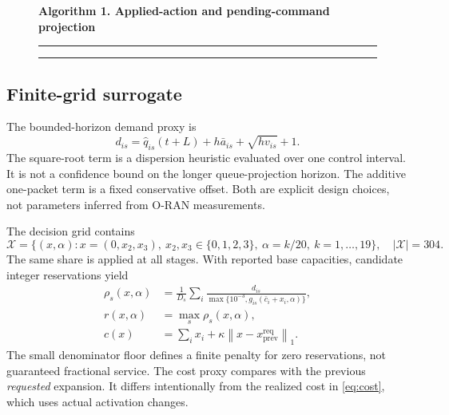\documentclass[10pt,a4paper]{article}
\newcommand{\norm}[1]{\left\lVert#1\right\rVert_1}
\newcommand{\algline}[3]{\node[anchor=west,font=\small] at (#2,-.48*#1) {#3};\node[anchor=east,font=\scriptsize,text=gray] at (-.15,-.48*#1) {#1}}
\begin{document}
\begin{figure}[htbp]\centering
\begin{minipage}{.96\linewidth}
\textbf{Algorithm 1. Applied-action and pending-command projection}\par\smallskip\hrule\smallskip
{}\hrule
\end{minipage}
\end{figure}

\subsection{Finite-grid surrogate}
The bounded-horizon demand proxy is
\begin{equation}
 d_{is}=\widehat q_{is}(t+L)+h\bar a_{is}+\sqrt{h v_{is}}+1.\label{eq:demand}
\end{equation}
The square-root term is a dispersion heuristic evaluated over one control
interval. It is not a confidence bound on the longer queue-projection horizon.
The additive one-packet term is a fixed conservative offset. Both are explicit
design choices, not parameters inferred from O-RAN measurements.

The decision grid contains
\begin{equation}
 \mathcal X=\{(x,\alpha):x=(0,x_2,x_3),\ x_2,x_3\in\{0,1,2,3\},
 \ \alpha=k/20,\ k=1,\ldots,19\},\quad |\mathcal X|=304.
\end{equation}
The same share is applied at all stages. With reported base capacities,
candidate integer reservations yield
\begin{align}
 \rho_s(x,\alpha)&=\frac1{D_s}\sum_i
 \frac{d_{is}}{\max\{10^{-3},g_{is}(\bar c_i+x_i,\alpha)\}},\\
 r(x,\alpha)&=\max_s\rho_s(x,\alpha),\\
 c(x)&=\sum_i x_i+\kappa\norm{x-x^{\mathrm{req}}_{\mathrm{prev}}}.\label{eq:proxycost}
\end{align}
The small denominator floor defines a finite penalty for zero reservations,
not guaranteed fractional service. The cost proxy compares with the previous
\emph{requested} expansion. It differs intentionally from the realized cost in
\eqref{eq:cost}, which uses actual activation changes.
\end{document}
